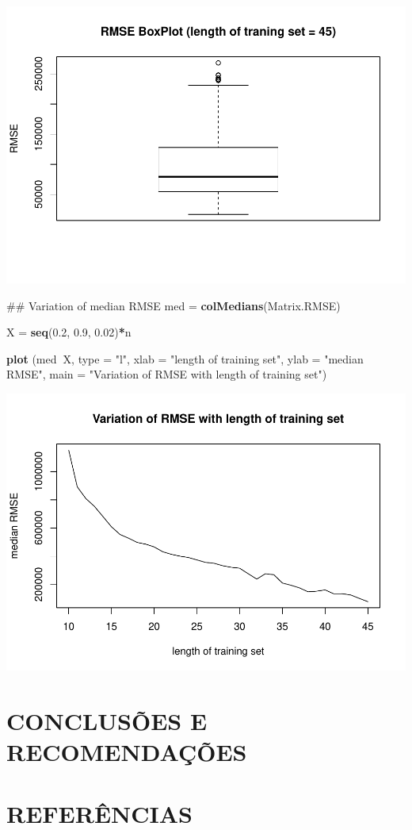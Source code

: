 \documentclass[a4paper, 12pt]{article}
\newenvironment{Shaded}{\begin{snugshade}}{\end{snugshade}}
\newcommand{\KeywordTok}[1]{\textcolor[rgb]{0.13,0.29,0.53}{\textbf{#1}}}
\newcommand{\DataTypeTok}[1]{\textcolor[rgb]{0.13,0.29,0.53}{#1}}
\newcommand{\FloatTok}[1]{\textcolor[rgb]{0.00,0.00,0.81}{#1}}
\newcommand{\StringTok}[1]{\textcolor[rgb]{0.31,0.60,0.02}{#1}}
\newcommand{\OperatorTok}[1]{\textcolor[rgb]{0.81,0.36,0.00}{\textbf{#1}}}
\newcommand{\NormalTok}[1]{#1}
\begin{document}
\includegraphics{Artigo_files/figure-latex/unnamed-chunk-7-1.pdf}

\begin{Shaded}
\begin{Highlighting}[]
\NormalTok{## Variation of median RMSE }
\NormalTok{med =}\StringTok{ }\KeywordTok{colMedians}\NormalTok{(Matrix.RMSE)}

\NormalTok{X =}\StringTok{ }\KeywordTok{seq}\NormalTok{(}\FloatTok{0.2}\NormalTok{, }\FloatTok{0.9}\NormalTok{, }\FloatTok{0.02}\NormalTok{)}\OperatorTok{*}\NormalTok{n}

\KeywordTok{plot}\NormalTok{ (med}\OperatorTok{~}\NormalTok{X, }\DataTypeTok{type =} \StringTok{"l"}\NormalTok{, }
      \DataTypeTok{xlab =} \StringTok{"length of training set"}\NormalTok{, }
      \DataTypeTok{ylab =} \StringTok{"median RMSE"}\NormalTok{, }
      \DataTypeTok{main =} \StringTok{"Variation of RMSE with length of training set"}\NormalTok{)}
\end{Highlighting}
\end{Shaded}

\includegraphics{Artigo_files/figure-latex/unnamed-chunk-8-1.pdf}

\section{CONCLUSÕES E RECOMENDAÇÕES}\label{conclusoes-e-recomendacoes}

\section{REFERÊNCIAS}\label{referencias}
\end{document}
